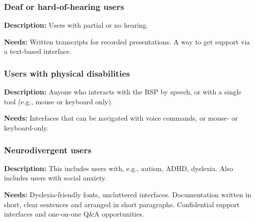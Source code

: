 \subsubsection{Deaf or hard-of-hearing users}

\textbf{Description:}
Users with partial or no hearing.

\textbf{Needs:}
Written transcripts for recorded presentations.
A way to get support via a text-based interface. 

\subsubsection{Users with physical disabilities}

\textbf{Description:}
Anyone who interacts with the RSP by speech, or with a single tool
(e.g., mouse or keyboard only).

\textbf{Needs:}
Interfaces that can be navigated with voice commands, or mouse- or keyboard-only.

\subsubsection{Neurodivergent users}

\textbf{Description:}
This includes users with, e.g., autism, ADHD, dyslexia.
Also includes users with social anxiety.

\textbf{Needs:}
Dyslexia-friendly fonts, uncluttered interfaces.
Documentation written in short, clear sentences and arranged in short paragraphs.
Confidential support interfaces and one-on-one Q\&A opportunities.
